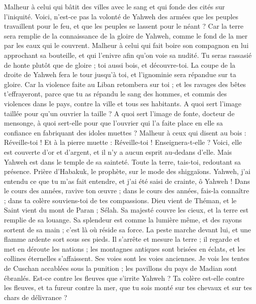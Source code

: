 \begin{multicols}{2}
Malheur à celui qui bâtit des villes avec le sang et qui fonde des cités sur l'iniquité.
Voici, n'est-ce pas la volonté de Yahweh des armées que les peuples travaillent pour le feu, et que les peuples se lassent pour le néant ?
Car la terre sera remplie de la connaissance de la gloire de Yahweh, comme le fond de la mer par les eaux qui le couvrent.
Malheur à celui qui fait boire son compagnon en lui approchant sa bouteille, et qui l'enivre afin qu'on voie sa nudité.
Tu seras rassasié de honte plutôt que de gloire ; toi aussi bois, et découvre-toi. La coupe de la droite de Yahweh fera le tour jusqu'à toi, et l'ignominie sera répandue sur ta gloire.
Car la violence faite au Liban retombera sur toi ; et les ravages des bêtes t'effrayeront, parce que tu as répandu le sang des hommes, et commis des violences dans le pays, contre la ville et tous ses habitants.
A quoi sert l'image taillée pour qu'un ouvrier la taille ? A quoi sert l'image de fonte, docteur de mensonge, à quoi sert-elle pour que l'ouvrier qui l'a faite place en elle sa confiance en fabriquant des idoles muettes ?
Malheur à ceux qui disent au bois : Réveille-toi ! Et à la pierre muette : Réveille-toi ! Enseignera-t-elle ? Voici, elle est couverte d'or et d'argent, et il n'y a aucun esprit au-dedans d'elle.
Mais Yahweh est dans le temple de sa sainteté. Toute la terre, tais-toi, redoutant sa présence.
\VerseOne{}Prière d'Habakuk, le prophète, sur le mode des shiggaïons.
Yahweh, j'ai entendu ce que tu m'as fait entendre, et j'ai été saisi de crainte, ô Yahweh ! Dans le cours des années, ravive ton œuvre ; dans le cours des années, fais-la connaître ; dans ta colère souviens-toi de tes compassions.
Dieu vient de Théman, et le Saint vient du mont de Paran ; Sélah. Sa majesté couvre les cieux, et la terre est remplie de sa louange.
Sa splendeur est comme la lumière même, et des rayons sortent de sa main ; c'est là où réside sa force.
La peste marche devant lui, et une flamme ardente sort sous ses pieds.
Il s'arrête et mesure la terre ; il regarde et met en déroute les nations ; les montagnes antiques sont brisées en éclats, et les collines éternelles s'affaissent. Ses voies sont les voies anciennes.
Je vois les tentes de Cuschan accablées sous la punition ; les pavillons du pays de Madian sont ébranlés.
Est-ce contre les fleuves que s'irrite Yahweh ? Ta colère est-elle contre les fleuves, et ta fureur contre la mer, que tu sois monté sur tes chevaux et sur tes chars de délivrance ?

\end{multicols}
